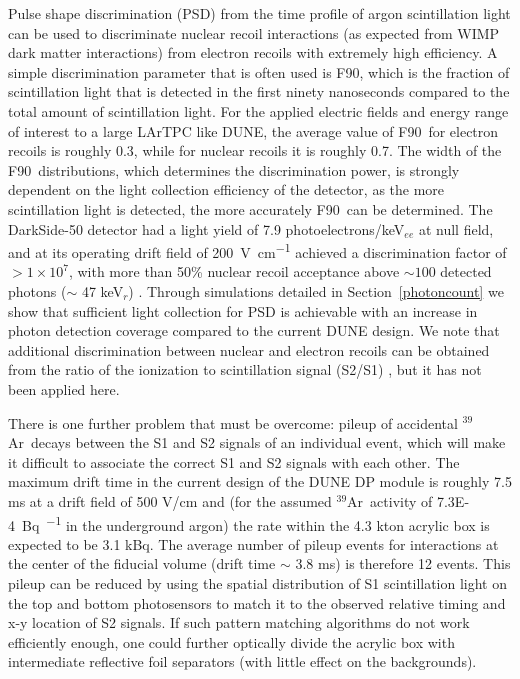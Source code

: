 \documentclass[a4paper,11pt]{article}
\newcommand{\artn}{$^{39}$Ar}
\newcommand{\fnt}{F90}
\begin{document}
Pulse shape discrimination (PSD) from the time profile of argon scintillation light can be used to discriminate nuclear recoil interactions (as expected from WIMP dark matter interactions) from electron recoils with extremely high efficiency. A simple discrimination parameter that is often used is \fnt, which is the fraction of scintillation light that is detected in the first ninety nanoseconds compared to the total amount of scintillation light. For the applied electric fields and energy range of interest to a large LArTPC like DUNE, the average value of \fnt~for electron recoils is roughly 0.3, while for nuclear recoils it is roughly 0.7. The width of the \fnt~distributions, which determines the discrimination power, is strongly dependent on the light collection efficiency of the detector, as the more scintillation light is detected, the more accurately \fnt~can be determined. The DarkSide-50 detector had a light yield of 7.9 photoelectrons/keV$_{ee}$ at null field, and at its operating drift field of \SI{200}{\volt\per\cm} achieved a discrimination factor of $> 1 \times 10^7$, with more than 50\% nuclear recoil acceptance above $\sim 100$ detected photons ($\sim$ 47 keV$_r$) \cite{DarkSide-50}. Through simulations detailed in Section~\ref{photoncount} we show that sufficient light collection for PSD is achievable with an increase in photon detection coverage compared to the current DUNE design. We note that additional discrimination between nuclear and electron recoils can be obtained from the ratio of the ionization to scintillation signal (S2/S1) \cite{benetti2008first}, but it has not been applied here.

There is one further problem that must be overcome: pileup of accidental \artn~decays between the S1 and S2 signals of an individual event, which will make it difficult to associate the correct S1 and S2 signals with each other. The maximum drift time in the current design of the DUNE DP module is roughly 7.5 ms at a drift field of 500 V/cm and (for the assumed \artn~activity of \SI{7.3E-4}{\becquerel\per\kgar} in the underground argon) the rate within the 4.3 kton acrylic box is expected to be 3.1 kBq. The average number of pileup events for interactions at the center of the fiducial volume (drift time $\sim$ 3.8 ms) is therefore 12 events. This pileup can be reduced by using the spatial distribution of S1 scintillation light on the top and bottom photosensors to match it to the observed relative timing and x-y location of S2 signals. If such pattern matching algorithms do not work efficiently enough, one could further optically divide the acrylic box with intermediate reflective foil separators (with little effect on the backgrounds).
\end{document}
